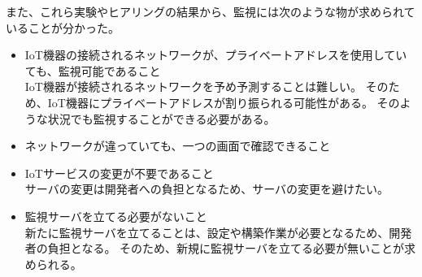 また、これら実験やヒアリングの結果から、監視には次のような物が求められていることが分かった。
\begin{itemize}
\item IoT機器の接続されるネットワークが、プライベートアドレスを使用していても、監視可能であること\\
	IoT機器が接続されるネットワークを予め予測することは難しい。
	そのため、IoT機器にプライベートアドレスが割り振られる可能性がある。
	そのような状況でも監視することができる必要がある。
\item ネットワークが違っていても、一つの画面で確認できること\\
\item IoTサービスの変更が不要であること\\
	サーバの変更は開発者への負担となるため、サーバの変更を避けたい。
\item 監視サーバを立てる必要がないこと\\
	新たに監視サーバを立てることは、設定や構築作業が必要となるため、開発者の負担となる。
	そのため、新規に監視サーバを立てる必要が無いことが求められる。
\end{itemize}



